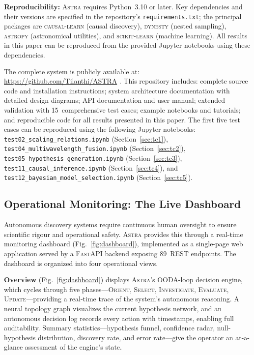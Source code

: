 \documentclass[usenatbib]{rasti}
\newcommand{\astra}{\textsc{Astra}\xspace}
\begin{document}
\textbf{Reproducibility:}
\astra requires Python~3.10 or later.
Key dependencies and their versions are specified in the repository's \texttt{requirements.txt}; the principal packages are \textsc{causal-learn} (causal discovery), \textsc{dynesty} (nested sampling), \textsc{astropy} (astronomical utilities), and \textsc{scikit-learn} (machine learning).
All results in this paper can be reproduced from the provided Jupyter notebooks using these dependencies.

The complete system is publicly available at: \url{https://github.com/Tilanthi/ASTRA} \citep{White2026}.
This repository includes: complete source code and installation instructions; system architecture documentation with detailed design diagrams; API documentation and user manual; extended validation with 15~comprehensive test cases; example notebooks and tutorials; and reproducible code for all results presented in this paper.
The first five test cases can be reproduced using the following Jupyter notebooks:
\texttt{test02\_scaling\_relations.ipynb} (Section~\ref{sec:tc1}),
\texttt{test04\_multiwavelength\_fusion.ipynb} (Section~\ref{sec:tc2}),
\texttt{test05\_hypothesis\_generation.ipynb} (Section~\ref{sec:tc3}),
\texttt{test11\_causal\_inference.ipynb} (Section~\ref{sec:tc4}), and
\texttt{test12\_bayesian\_model\_selection.ipynb} (Section~\ref{sec:tc5}).

\subsection{Operational Monitoring: The Live Dashboard}
\label{sec:methods:dashboard}

Autonomous discovery systems require continuous human oversight to ensure scientific rigour and operational safety.
\astra provides this through a real-time monitoring dashboard (Fig.~\ref{fig:dashboard}), implemented as a single-page web application served by a \textsc{FastAPI} backend exposing 89~REST endpoints.
The dashboard is organized into four operational views.

\textbf{Overview} (Fig.~\ref{fig:dashboard}) displays \astra's OODA-loop decision engine, which cycles through five phases---\textsc{Orient}, \textsc{Select}, \textsc{Investigate}, \textsc{Evaluate}, \textsc{Update}---providing a real-time trace of the system's autonomous reasoning.
A neural topology graph visualizes the current hypothesis network, and an autonomous decision log records every action with timestamps, enabling full auditability.
Summary statistics---hypothesis funnel, confidence radar, null-hypothesis distribution, discovery rate, and error rate---give the operator an at-a-glance assessment of the engine's state.
\end{document}
